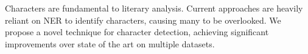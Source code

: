 Characters are fundamental to literary analysis.  Current approaches are heavily reliant on NER to identify characters, causing many to be overlooked. We propose a novel technique for character detection, achieving significant improvements over state of the art on multiple datasets.
